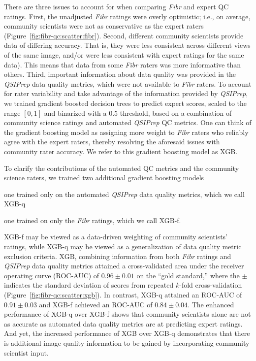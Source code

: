\documentclass[9pt,lineno]{elife}
\begin{document}
There are three issues to account for when comparing \emph{Fibr} and expert QC ratings. First, the unadjusted \emph{Fibr} ratings were overly optimistic; i.e., on average,
community scientists were not as conservative as the expert raters
(Figure~\ref{fig:fibr-qc:scatter:fibr}). Second, different community scientists
provide data of differing accuracy. That is, they were less consistent across different views of the same image, and/or were less consistent with expert ratings for the same data). This means that data from some \emph{Fibr} raters was more informative than others. Third, important information
about data quality was provided in the \emph{QSIPrep} data quality metrics, which were not available to \emph{Fibr} raters. To account for rater
variability and take advantage of the information provided by \emph{QSIPrep},
we trained gradient boosted decision trees \citep{chen2016-eb} to predict expert scores, scaled to the range $[0, 1]$ and
binarized with a $0.5$ threshold,
based on a combination of community science ratings and automated \emph{QSIPrep}
QC metrics. One can think of the gradient boosting model as assigning more weight to \emph{Fibr} raters who reliably agree with the expert raters, thereby resolving the aforesaid issues with community rater accuracy. We refer to this gradient boosting model as XGB.

To clarify the contributions of the automated QC metrics and the community
science raters, we trained two additional gradient boosting models
\begin{enumerate*}[%
    label=(\roman*),%
    before=\unskip{: },%
    itemjoin={{, }},%
    itemjoin*={{ and }}]
    \item one trained only on the automated \emph{QSIPrep} data quality metrics, which we
    call XGB-q
    \item one trained on only the \emph{Fibr} ratings, which we call XGB-f.
\end{enumerate*}
XGB-f may be viewed as a data-driven weighting of community scientists' ratings,
while XGB-q may be viewed as a generalization of data quality metric exclusion criteria.
XGB, combining information from both \emph{Fibr} ratings and \emph{QSIPrep} data quality
metrics attained a cross-validated area under the receiver operating curve
(ROC-AUC) of $0.96 \pm 0.01$ on the ``gold standard,'' where the $\pm$ indicates
the standard deviation of scores from repeated $k$-fold cross-validation
(Figure~\ref{fig:fibr-qc:scatter:xgb}). In contrast, XGB-q attained an ROC-AUC of
$0.91 \pm 0.03$ and XGB-f achieved an ROC-AUC of $0.84 \pm 0.04$.
The enhanced
performance of XGB-q over XGB-f shows that community scientists alone are not as
accurate as automated data quality metrics are at predicting expert ratings. And yet, the
increased performance of XGB over XGB-q demonstrates that there is additional
image quality information to be gained by incorporating community scientist input.
\end{document}
